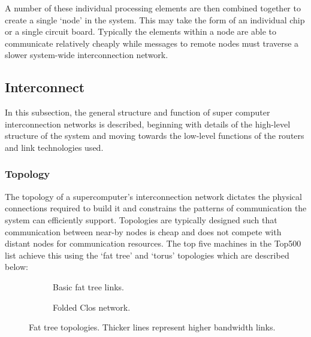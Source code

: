 			A number of these individual processing elements are then combined
			together to create a single `node' in the system. This may take the form
			of an individual chip or a single circuit board. Typically the elements
			within a node are able to communicate relatively cheaply while messages to
			remote nodes must traverse a slower system-wide interconnection network.
		
		\subsection{Interconnect}
			
			In this subsection, the general structure and function of super computer
			interconnection networks is described, beginning with details of the
			high-level structure of the system and moving towards the low-level
			functions of the routers and link technologies used.
			
			\subsubsection{Topology}
				
				
				The topology of a supercomputer's interconnection network dictates the
				physical connections required to build it and constrains the patterns of
				communication the system can efficiently support. Topologies are
				typically designed such that communication between near-by nodes is
				cheap and does not compete with distant nodes for communication
				resources. The top five machines in the Top500 list achieve this using
				the `fat tree' and `torus' topologies which are described below:
				
				\begin{figure}
					\begin{subfigure}[t]{\textwidth}
						\center
						
						\caption{Basic fat tree links.}
						\label{fig:fat-tree-concept}
					\end{subfigure}
					
					\vspace{1.5em}
					
					\begin{subfigure}[t]{\textwidth}
						\center
						
						\caption{Folded Clos network.}
						\label{fig:fat-tree-closs}
					\end{subfigure}
					
					\caption[Fat tree topologies.]{Fat tree topologies. Thicker lines
					represent higher bandwidth links.}
					\label{fig:fat-tree}
				\end{figure}
				
